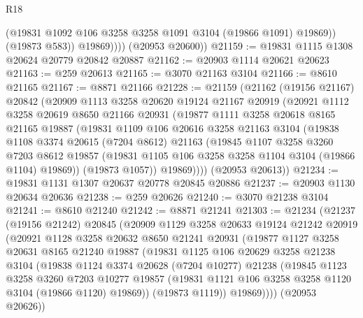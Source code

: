 \begin{lexlean}{R18}
\begin{coremodule}
                  (@19831 @1092 @106 @3258 @3258 @1091 @3104 (@19866 @1091) @19869))
                (@19873 @583))
              @19869))))
      (@20953 @20600))
@21159 := @19831 @1115 @1308 @20624 @20779 @20842 @20887
@21162 := @20903 @1114 @20621 @20623
@21163 := @259 @20613
@21165 := @3070 @21163 @3104
@21166 := @8610 @21165
@21167 := @8871 @21166
@21228 := @21159
    (@21162
      (@19156 @21167)
      @20842
      (@20909
        @1113
        @3258
        @20620
        @19124
        @21167
        @20919
        (@20921
          @1112
          @3258
          @20619
          @8650
          @21166
          @20931
          (@19877
            @1111
            @3258
            @20618
            @8165
            @21165
            @19887
            (@19831
              @1109
              @106
              @20616
              @3258
              @21163
              @3104
              (@19838
                @1108
                @3374
                @20615
                (@7204 @8612)
                @21163
                (@19845
                  @1107
                  @3258
                  @3260
                  @7203
                  @8612
                  @19857
                  (@19831 @1105 @106 @3258 @3258 @1104 @3104 (@19866 @1104) @19869))
                (@19873 @1057))
              @19869))))
      (@20953 @20613))
@21234 := @19831 @1131 @1307 @20637 @20778 @20845 @20886
@21237 := @20903 @1130 @20634 @20636
@21238 := @259 @20626
@21240 := @3070 @21238 @3104
@21241 := @8610 @21240
@21242 := @8871 @21241
@21303 := @21234
    (@21237
      (@19156 @21242)
      @20845
      (@20909
        @1129
        @3258
        @20633
        @19124
        @21242
        @20919
        (@20921
          @1128
          @3258
          @20632
          @8650
          @21241
          @20931
          (@19877
            @1127
            @3258
            @20631
            @8165
            @21240
            @19887
            (@19831
              @1125
              @106
              @20629
              @3258
              @21238
              @3104
              (@19838
                @1124
                @3374
                @20628
                (@7204 @10277)
                @21238
                (@19845
                  @1123
                  @3258
                  @3260
                  @7203
                  @10277
                  @19857
                  (@19831 @1121 @106 @3258 @3258 @1120 @3104 (@19866 @1120) @19869))
                (@19873 @1119))
              @19869))))
      (@20953 @20626))

\end{coremodule}
\end{lexlean}
